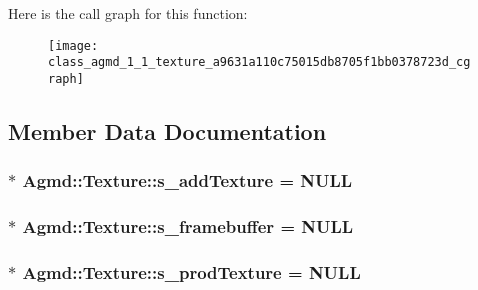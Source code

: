 Here is the call graph for this function\+:\nopagebreak
\begin{figure}[H]
\begin{center}
\leavevmode
\texttt{[image: class\_agmd\_1\_1\_texture\_a9631a110c75015db8705f1bb0378723d\_cgraph]}
\end{center}
\end{figure}




\subsection{Member Data Documentation}
\hypertarget{class_agmd_1_1_texture_a6928c69dec0e98efd09441b8b1622c03}{
\subsubsection[{s\+\_\+add\+Texture}]{ $\ast$ Agmd\+::\+Texture\+::s\+\_\+add\+Texture = N\+U\+L\+L\hspace{0.3cm}{\ttfamily [static]}}}\label{class_agmd_1_1_texture_a6928c69dec0e98efd09441b8b1622c03}
\hypertarget{class_agmd_1_1_texture_a7a630a36d895b3d403febf19755940eb}{
\subsubsection[{s\+\_\+framebuffer}]{ $\ast$ Agmd\+::\+Texture\+::s\+\_\+framebuffer = N\+U\+L\+L\hspace{0.3cm}{\ttfamily [static]}}}\label{class_agmd_1_1_texture_a7a630a36d895b3d403febf19755940eb}
\hypertarget{class_agmd_1_1_texture_a354c691fb837c97c9a0660268521fae6}{
\subsubsection[{s\+\_\+prod\+Texture}]{ $\ast$ Agmd\+::\+Texture\+::s\+\_\+prod\+Texture = N\+U\+L\+L\hspace{0.3cm}{\ttfamily [static]}}}\label{class_agmd_1_1_texture_a354c691fb837c97c9a0660268521fae6}
